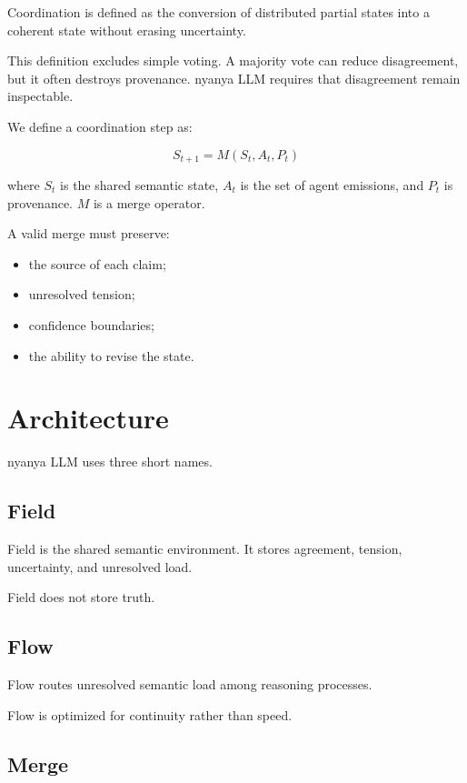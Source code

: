 \documentclass[11pt]{article}
\begin{document}
Coordination is defined as the conversion of distributed partial states into a
coherent state without erasing uncertainty.

This definition excludes simple voting. A majority vote can reduce
disagreement, but it often destroys provenance. nyanya LLM requires that
disagreement remain inspectable.

We define a coordination step as:

\begin{equation}
S_{t+1} = M(S_t, A_t, P_t)
\end{equation}

where $S_t$ is the shared semantic state, $A_t$ is the set of agent emissions,
and $P_t$ is provenance. $M$ is a merge operator.

A valid merge must preserve:

\begin{itemize}
  \item the source of each claim;
  \item unresolved tension;
  \item confidence boundaries;
  \item the ability to revise the state.
\end{itemize}

\section{Architecture}

nyanya LLM uses three short names.

\subsection{Field}

Field is the shared semantic environment. It stores agreement, tension,
uncertainty, and unresolved load.

Field does not store truth.

\subsection{Flow}

Flow routes unresolved semantic load among reasoning processes.

Flow is optimized for continuity rather than speed.

\subsection{Merge}
\end{document}
